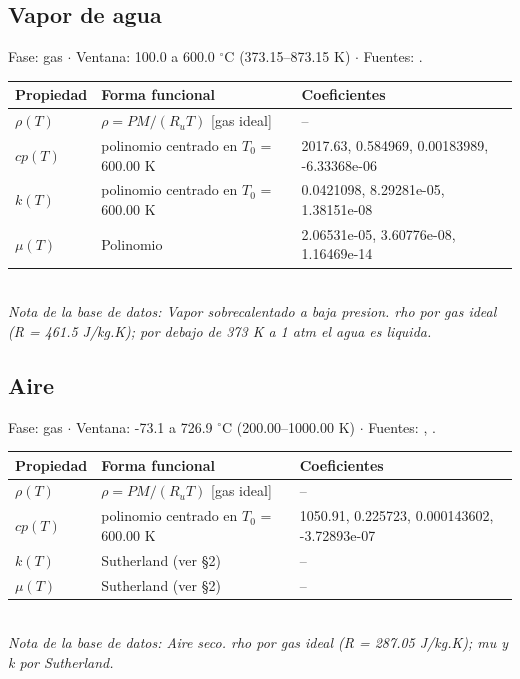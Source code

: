 \documentclass[11pt,a4paper]{article}
\begin{document}
\subsection*{Vapor de agua}
{\small\color{gristexto} Fase: gas $\cdot$ Ventana:
 100.0 a 600.0 $^\circ$C (373.15--873.15 K)
 $\cdot$ Fuentes: \cite{incropera}.}\\[2pt]
\begin{tabular}{llp{7.6cm}}
\toprule
\textbf{Propiedad} & \textbf{Forma funcional} & \textbf{Coeficientes} \\
\midrule
$\rho(T)$ & $\rho = P M/(R_u T)$  [gas ideal] & -- \\
$cp(T)$ & polinomio centrado en $T_0$ = 600.00 K & 2017.63, 0.584969, 0.00183989, -6.33368e-06 \\
$k(T)$ & polinomio centrado en $T_0$ = 600.00 K & 0.0421098, 8.29281e-05, 1.38151e-08 \\
$\mu(T)$ & Polinomio & 2.06531e-05, 3.60776e-08, 1.16469e-14 \\
\bottomrule
\end{tabular}\\[3pt]
{\footnotesize\itshape Nota de la base de datos: Vapor sobrecalentado a baja presion. rho por gas ideal (R = 461.5 J/kg.K); por debajo de 373 K a 1 atm el agua es liquida.}
\vspace{0.7em}


\subsection*{Aire}
{\small\color{gristexto} Fase: gas $\cdot$ Ventana:
 -73.1 a 726.9 $^\circ$C (200.00--1000.00 K)
 $\cdot$ Fuentes: \cite{incropera}, \cite{sutherland}.}\\[2pt]
\begin{tabular}{llp{7.6cm}}
\toprule
\textbf{Propiedad} & \textbf{Forma funcional} & \textbf{Coeficientes} \\
\midrule
$\rho(T)$ & $\rho = P M/(R_u T)$  [gas ideal] & -- \\
$cp(T)$ & polinomio centrado en $T_0$ = 600.00 K & 1050.91, 0.225723, 0.000143602, -3.72893e-07 \\
$k(T)$ & Sutherland (ver \S2) & -- \\
$\mu(T)$ & Sutherland (ver \S2) & -- \\
\bottomrule
\end{tabular}\\[3pt]
{\footnotesize\itshape Nota de la base de datos: Aire seco. rho por gas ideal (R = 287.05 J/kg.K); mu y k por Sutherland.}
\vspace{0.7em}
\end{document}
